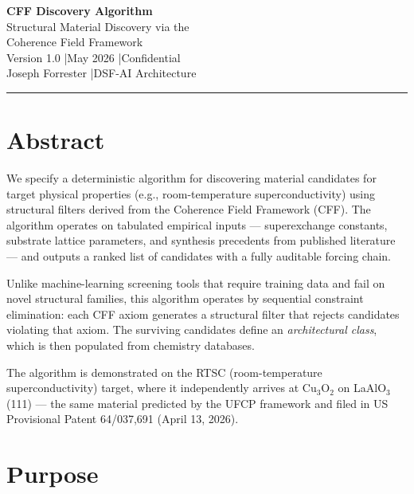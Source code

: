 \documentclass[11pt, a4paper]{article}
\begin{document}
\begin{center}
  {\LARGE \textbf{CFF Discovery Algorithm}}\\[6pt]
  {\large Structural Material Discovery via the}\\[2pt]
  {\large Coherence Field Framework}\\[10pt]
  {\color{nm-gray}\small Version 1.0 \quad|\quad May 2026 \quad|\quad Confidential}\\[4pt]
  {\color{nm-gray}\small Joseph Forrester \quad|\quad DSF-AI Architecture}
\end{center}

\vspace{1em}
\hrule
\vspace{1em}

\section*{Abstract}

We specify a deterministic algorithm for discovering material
candidates for target physical properties (e.g., room-temperature
superconductivity) using structural filters derived from the
Coherence Field Framework (CFF). The algorithm operates on tabulated
empirical inputs --- superexchange constants, substrate lattice
parameters, and synthesis precedents from published literature ---
and outputs a ranked list of candidates with a fully auditable
forcing chain.

Unlike machine-learning screening tools that require training data
and fail on novel structural families, this algorithm operates by
sequential constraint elimination: each CFF axiom generates a
structural filter that rejects candidates violating that axiom.
The surviving candidates define an \textit{architectural class},
which is then populated from chemistry databases.

The algorithm is demonstrated on the RTSC (room-temperature
superconductivity) target, where it independently arrives at
Cu$_3$O$_2$ on LaAlO$_3$(111) --- the same material predicted by
the UFCP framework and filed in US Provisional Patent 64/037,691
(April 13, 2026).

\tableofcontents

\section{Purpose}
\end{document}
